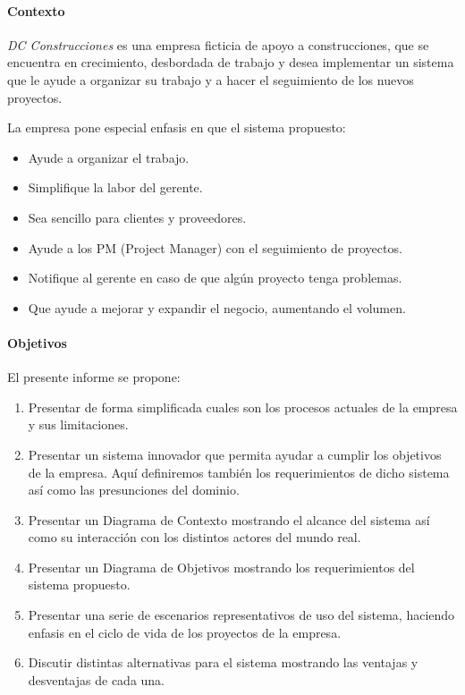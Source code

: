 \paragraph{Contexto}
\textit{DC Construcciones} es una empresa ficticia de apoyo a construcciones,
que se encuentra en crecimiento, desbordada de trabajo y desea implementar un
sistema que le ayude a organizar su trabajo y a hacer el seguimiento de los nuevos proyectos.

La empresa pone especial enfasis en que el sistema propuesto:

\begin{itemize}
    \item Ayude a organizar el trabajo.
    \item Simplifique la labor del gerente.
    \item Sea sencillo para clientes y proveedores.
    \item Ayude a los PM (Project Manager) con el seguimiento de proyectos.
    \item Notifique al gerente en caso de que algún proyecto tenga problemas.
    \item Que ayude a mejorar y expandir el negocio, aumentando el volumen.
\end{itemize}

\paragraph{Objetivos}
El presente informe se propone:

\begin{enumerate}
    \item Presentar de forma simplificada cuales son los procesos actuales de la empresa y sus limitaciones.
    \item Presentar un sistema innovador que permita ayudar a cumplir los objetivos de la empresa.
        Aquí definiremos también los requerimientos de dicho sistema así como las presunciones del dominio.
    \item Presentar un Diagrama de Contexto mostrando el alcance del sistema así como su interacción con los distintos actores del mundo real.
    \item Presentar un Diagrama de Objetivos mostrando los requerimientos del sistema propuesto.
    \item Presentar una serie de escenarios representativos de uso del sistema, haciendo enfasis en el ciclo de vida de los proyectos de la empresa.
    \item Discutir distintas alternativas para el sistema mostrando las ventajas y desventajas de cada una.
\end{enumerate}
